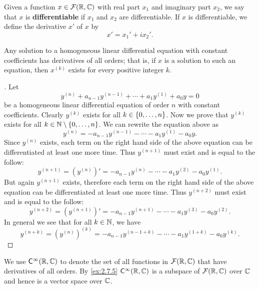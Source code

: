\begin{defn}\label{2.7.3}
  Given a function \(x \in \mathcal{F}(\mathbb{R}, \mathbb{C})\) with real part \(x_1\) and imaginary part \(x_2\), we say that \(x\) is \textbf{differentiable} if \(x_1\) and \(x_2\) are differentiable.
  If \(x\) is differentiable, we define the derivative \(x'\) of \(x\) by
  \[
    x' = x_1' + i x_2'.
  \]
\end{defn}

\begin{thm}\label{2.27}
  Any solution to a homogeneous linear differential equation with constant coefficients has derivatives of all orders;
  that is, if \(x\) is a solution to such an equation, then \(x^{(k)}\) exists for every positive integer \(k\).
\end{thm}

\begin{proof}[]
  Let
  \[
    y^{(n)} + a_{n - 1} y^{(n - 1)} + \cdots + a_1 y^{(1)} + a_0 y = 0
  \]
  be a homogeneous linear differential equation of order \(n\) with constant coefficients.
  Clearly \(y^{(k)}\) exists for all \(k \in \left\lbrace0, \dots, n\right\rbrace\).
  Now we prove that \(y^{(k)}\) exists for all \(k \in \mathbb{N} \setminus \left\lbrace0, \dots, n\right\rbrace\).
  We can rewrite the equation above as
  \[
    y^{(n)} = -a_{n - 1} y^{(n - 1)} - \cdots - a_1 y^{(1)} - a_0 y.
  \]
  Since \(y^{(n)}\) exists, each term on the right hand side of the above equation can be differentiated at least one more time.
  Thus \(y^{(n + 1)}\) must exist and is equal to the follow:
  \[
    y^{(n + 1)} = (y^{(n)})' = -a_{n - 1} y^{(n)} - \cdots - a_1 y^{(2)} - a_0 y^{(1)}.
  \]
  But again \(y^{(n + 1)}\) exists, therefore each term on the right hand side of the above equation can be differentiated at least one more time.
  Thus \(y^{(n + 2)}\) must exist and is equal to the follow:
  \[
    y^{(n + 2)} = (y^{(n + 1)})' = -a_{n - 1} y^{(n + 1)} - \cdots - a_1 y^{(3)} - a_0 y^{(2)}.
  \]
  In general we see that for all \(k \in \mathbb{N}\), we have
  \[
    y^{(n + k)} = (y^{(n)})^{(k)} = -a_{n - 1} y^{(n - 1 + k)} - \cdots - a_1 y^{(1 + k)} - a_0 y^{(k)}.
  \]
\end{proof}

\begin{defn}\label{2.7.4}
  We use \(\cfs[\infty](\R, \C)\) to denote the set of all functions in \(\mathcal{F}(\mathbb{R}, \mathbb{C})\) that have derivatives of all orders.
  By \cref{ex:2.7.5} \(\cfs[\infty](\R, \C)\) is a subspace of \(\mathcal{F}(\mathbb{R}, \mathbb{C})\) over \(\mathbb{C}\) and hence is a vector space over \(\mathbb{C}\).
\end{defn}

